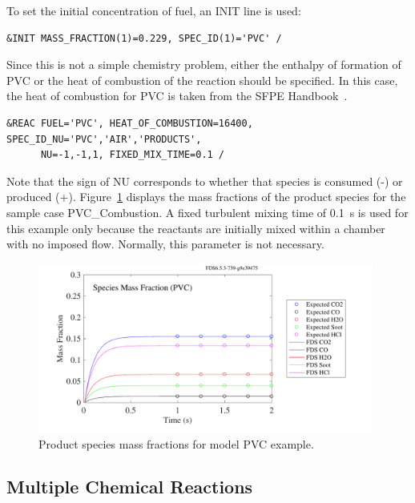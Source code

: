 \documentclass[11pt]{book}
\begin{document}
To set the initial concentration of fuel, an {\ct INIT} line is used:
\begin{lstlisting}
&INIT MASS_FRACTION(1)=0.229, SPEC_ID(1)='PVC' /
\end{lstlisting}
Since this is not a simple chemistry problem, either the enthalpy of formation of PVC or the heat of combustion of the reaction should be specified. In this case, the heat of combustion for PVC is taken from the SFPE Handbook~\cite{SFPE:Tewarson}.
\begin{lstlisting}
&REAC FUEL='PVC', HEAT_OF_COMBUSTION=16400, SPEC_ID_NU='PVC','AIR','PRODUCTS',
      NU=-1,-1,1, FIXED_MIX_TIME=0.1 /
\end{lstlisting}
Note that the sign of {\ct NU} corresponds to whether that species is consumed (-) or produced (+). Figure~\ref{pvc_combustion} displays the mass fractions of the product species for the sample case {\ct PVC\_Combustion}. A fixed turbulent mixing time of 0.1~s is used for this example only because the reactants are initially mixed within a chamber with no imposed flow. Normally, this parameter is not necessary.


\begin{figure}[ht]
\centering \includegraphics[height=2.2in]{SCRIPT_FIGURES/pvc_combustion_spec}
\caption[Results of the {\ct pvc\_combustion} test case]{Product species mass fractions for model PVC example.}
\label{pvc_combustion}
\end{figure}

\subsection{Multiple Chemical Reactions}
\label{info:multi-reac}
\end{document}
